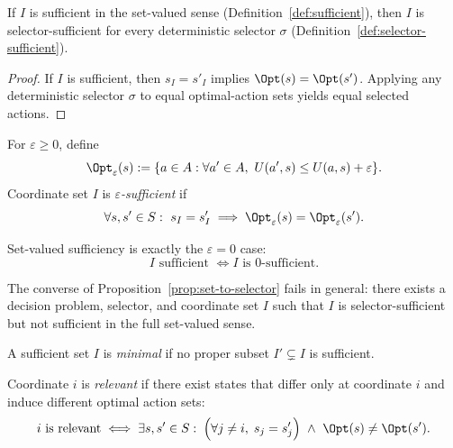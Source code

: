 \begin{proposition}\label{prop:set-to-selector}
If $I$ is sufficient in the set-valued sense (Definition~\ref{def:sufficient}), then $I$ is selector-sufficient for every deterministic selector $\sigma$ (Definition~\ref{def:selector-sufficient}).
\end{proposition}

\begin{proof}
If $I$ is sufficient, then $s_I=s'_I$ implies $\Opt(s)=\Opt(s')$. Applying any deterministic selector $\sigma$ to equal optimal-action sets yields equal selected actions.
\end{proof}

\begin{definition}\label{def:epsilon-sufficiency}
For $\varepsilon \ge 0$, define
\[
\Opt_\varepsilon(s)
:=
\{a\in A:\forall a'\in A,\ U(a',s)\le U(a,s)+\varepsilon\}.
\]
Coordinate set $I$ is \emph{$\varepsilon$-sufficient} if
\[
\forall s,s'\in S:\ s_I=s'_I \implies \Opt_\varepsilon(s)=\Opt_\varepsilon(s').
\]
\end{definition}

\begin{proposition}\label{prop:zero-epsilon-reduction}
Set-valued sufficiency is exactly the $\varepsilon=0$ case:
\[
I\text{ sufficient } \iff I\text{ is }0\text{-sufficient}.
\]
\end{proposition}

\begin{proposition}\label{prop:selector-separation}
The converse of Proposition~\ref{prop:set-to-selector} fails in general: there exists a decision problem, selector, and coordinate set $I$ such that $I$ is selector-sufficient but not sufficient in the full set-valued sense.
\end{proposition}

\begin{definition}\label{def:minimal-sufficient}
A sufficient set $I$ is \emph{minimal} if no proper subset $I' \subsetneq I$ is sufficient.
\end{definition}

\begin{definition}\label{def:relevant}
Coordinate $i$ is \emph{relevant} if there exist states that differ only at coordinate $i$ and induce different optimal action sets:
\[
i \text{ is relevant}
\iff
\exists s,s' \in S:\; \Big(\forall j \neq i,\; s_j = s'_j\Big)\ \wedge\ \Opt(s)\neq\Opt(s').
\]
\end{definition}

